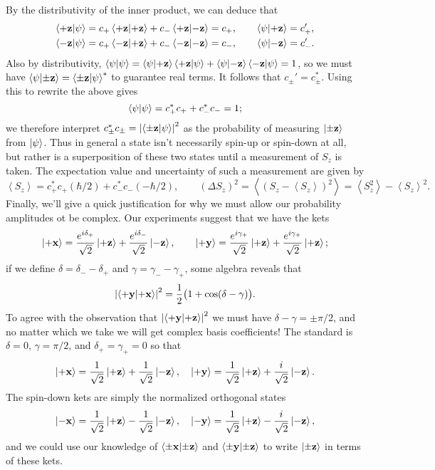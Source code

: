 \documentclass[../p116main.tex]{subfiles}
\begin{document}
By the distributivity of the inner product, we can deduce that
\begin{align*}
    \left< +\mathbf{z} \middle| \psi \right> &= c_+ \left< +\mathbf{z} \middle| +\mathbf{z} \right> + c_- \left< +\mathbf{z} \middle| -\mathbf{z} \right> = c_+, \qquad \left< \psi \middle| +\mathbf{z} \right> = c_+', \\
    \left< -\mathbf{z} \middle| \psi \right> &= c_+ \left< -\mathbf{z} \middle| +\mathbf{z} \right> + c_- \left< -\mathbf{z} \middle| -\mathbf{z} \right> = c_-, \qquad \left< \psi \middle| -\mathbf{z} \right> = c_-'.
\end{align*}
Also by distributivity, $\left< \psi \middle| \psi \right> = \left< \psi \middle| +\mathbf{z} \right> \left< +\mathbf{z} \middle| \psi \right> + \left< \psi \middle| -\mathbf{z} \right> \left< -\mathbf{z} \middle| \psi \right> = 1$, so we must have $\left< \psi \middle| \pm\mathbf{z} \right> = \left< \pm\mathbf{z} \middle| \psi \right>^*$ to guarantee real terms.
It follows that $c_\pm' = c_\pm^*$.
Using this to rewrite the above gives
\[ \left< \psi \middle| \psi \right> = c_+^* c_+ + c_-^* c_- = 1; \]
we therefore interpret $c_\pm^* c_\pm = \left| \left< \pm \mathbf{z} \middle| \psi \right> \right|^2$ as the probability of measuring $\left| \pm \mathbf{z} \right>$ from $\left| \psi \right>$.
Thus in general a state isn't necessarily spin-up or spin-down at all, but rather is a superposition of these two states until a measurement of $S_z$ is taken.
The expectation value and uncertainty of such a measurement are given by
\[ \left< S_z \right> = c_+^* c_+ (\hbar / 2) + c_-^* c_- (-\hbar / 2), \qquad (\Delta S_z)^2 = \left< (S_z - \left< S_z \right>)^2 \right> = \left< S_z^2 \right> - \left< S_z \right>^2. \]
Finally, we'll give a quick justification for why we must allow our probability amplitudes ot be complex.
Our experiments suggest that we have the kets
\[ \left| +\mathbf{x} \right> = \frac{e^{i \delta_+}}{\sqrt{2}} \left| +\mathbf{z} \right> + \frac{e^{i \delta_-}}{\sqrt{2}} \left| -\mathbf{z} \right>, \qquad \left| +\mathbf{y} \right> = \frac{e^{i \gamma_+}}{\sqrt{2}} \left| +\mathbf{z} \right> + \frac{e^{i \gamma_+}}{\sqrt{2}} \left| +\mathbf{z} \right>; \]
if we define $\delta = \delta_- - \delta_+$ and $\gamma = \gamma_- - \gamma_+$, some algebra reveals that
\[ \left| \left< +\mathbf{y} \middle| +\mathbf{x} \right> \right|^2 = \frac{1}{2} \big( 1 + \cos(\delta - \gamma) \big). \]
To agree with the observation that $\left| \left< +\mathbf{y} \middle| +\mathbf{z} \right> \right|^2$ we must have $\delta - \gamma = \pm \pi / 2$, and no matter which we take we will get complex basis coefficients!
The standard is $\delta = 0$, $\gamma = \pi / 2$, and $\delta_+ = \gamma_+ = 0$ so that
\[ \left| +\mathbf{x} \right> = \frac{1}{\sqrt{2}} \left| +\mathbf{z} \right> + \frac{1}{\sqrt{2}} \left| -\mathbf{z} \right>, \quad \left| +\mathbf{y} \right> = \frac{1}{\sqrt{2}} \left| +\mathbf{z} \right> + \frac{i}{\sqrt{2}} \left| -\mathbf{z} \right>. \]
The spin-down kets are simply the normalized orthogonal states
\[ \left| -\mathbf{x} \right> = \frac{1}{\sqrt{2}} \left| +\mathbf{z} \right> - \frac{1}{\sqrt{2}} \left| -\mathbf{z} \right>, \quad \left| -\mathbf{y} \right> = \frac{1}{\sqrt{2}} \left| +\mathbf{z} \right> - \frac{i}{\sqrt{2}} \left| -\mathbf{z} \right>, \]
and we could use our knowledge of $\left< \pm \mathbf{x} \middle| \pm \mathbf{z} \right>$ and $\left< \pm \mathbf{y} \middle| \pm \mathbf{z} \right>$ to write $\left| \pm \mathbf{z} \right>$ in terms of these kets.
\end{document}
